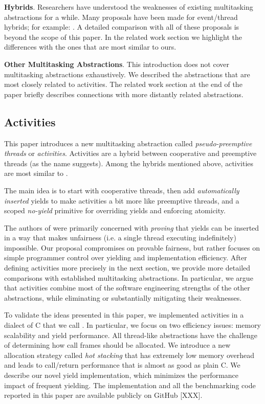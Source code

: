 \documentclass[10pt,preprint]{sigplanconf}
\begin{document}
\textbf{Hybrids}.
Researchers have understood the weaknesses of existing multitasking abstractions for a while.
Many proposals have been made for event/thread hybrids; for example: \cite{Boudol2007, Boussinot2006, Cunningham2005, Dabrowski2006, Fischer2007, Kerneis2014, Krohn2007, Li2007, Behren2003}.
A detailed comparison with all of these proposals is beyond the scope of this paper.
In the related work section we highlight the differences with the ones that are most similar to ours.

\textbf{Other Multitasking Abstractions}.
This introduction does not cover multitasking abstractions exhaustively.
We described the abstractions that are most closely related to activities.
The related work section at the end of the paper briefly describes connections with more distantly related abstractions.

\subsection{Activities}

This paper introduces a new multitasking abstraction called \emph{pseudo-preemptive threads} or \emph{activities}.
Activities are a hybrid between cooperative and preemptive threads (as the name suggests).
Among the hybrids mentioned above, activities are most similar to \cite{Boudol2007}.

The main idea is to start with cooperative threads, then add \emph{automatically inserted} yields to make activities a bit more like preemptive threads, and a scoped \emph{no-yield} primitive for overriding yields and enforcing atomicity.

The authors of \cite{Boudol2007} were primarily concerned with \emph{proving} that yields can be inserted in a way that makes unfairness (i.e. a single thread executing indefinitely) impossible.
Our proposal compromises on provable fairness, but rather focuses on simple programmer control over yielding and implementation efficiency.
After defining activities more precisely in the next section, we provide more detailed comparisons with established multitasking abstractions.
In particular, we argue that activities combine most of the software engineering strengths of the other abstractions, while eliminating or substantially mitigating their weaknesses.

To validate the ideas presented in this paper, we implemented activities in a dialect of C that we call \charcoal{}.
In particular, we focus on two efficiency issues: memory scalability and yield performance.
All thread-like abstractions have the challenge of determining how call frames should be allocated.
We introduce a new allocation strategy called \emph{hot stacking} that has extremely low memory overhead and leads to call/return performance that is almost as good as plain C.
We describe our novel yield implementation, which minimizes the performance impact of frequent yielding.
The \charcoal{} implementation and all the benchmarking code reported in this paper are available publicly on GitHub [XXX].
\end{document}
